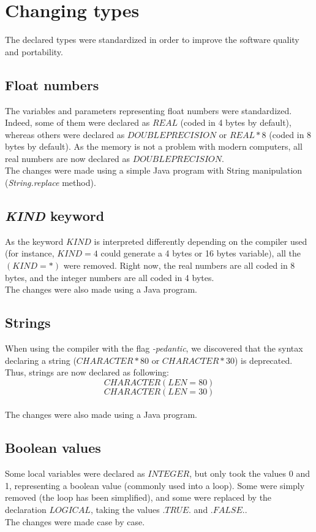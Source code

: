 \section{Changing types}
The declared types were standardized in order to improve the software quality and portability.

\subsection{Float numbers}
The variables and parameters representing float numbers were standardized. Indeed, some of them were declared as $REAL$ (coded in 4 bytes by default), whereas others were declared as $DOUBLE PRECISION$ or $REAL*8$ (coded in 8 bytes by default). As the memory is not a problem with modern computers, all real numbers are now declared as $DOUBLE PRECISION$.
\\The changes were made using a simple Java program with String manipulation (\textit{String.replace} method).

\subsection{\textit{KIND} keyword}
As the keyword $KIND$ is interpreted differently depending on the compiler used (for instance, $KIND=4$ could generate a 4 bytes or 16 bytes variable), all the $(KIND=*)$ were removed.
Right now, the real numbers are all coded in 8 bytes, and the integer numbers are all coded in 4 bytes.
\\The changes were also made using a Java program.

\subsection{Strings}
When using the compiler with the flag \textit{-pedantic}, we discovered that the syntax declaring a string ($CHARACTER*80$ or $CHARACTER*30$) is deprecated. Thus, strings are now declared as following: 
\[CHARACTER (LEN=80)\]
\[CHARACTER (LEN=30)\]
\\The changes were also made using a Java program.

\subsection{Boolean values}
Some local variables were declared as $INTEGER$, but only took the values 0 and 1, representing a boolean value (commonly used into a loop). Some were simply removed (the loop has been simplified), and some were replaced by the declaration $LOGICAL$, taking the values $.TRUE.$ and $.FALSE.$.
\\The changes were made case by case.


